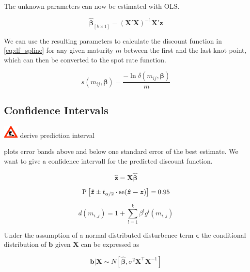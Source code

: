        
The unknown parameters can now be estimated with OLS.
	
\begin{equation}
\label{eq:paramspline}
\bm{\hat \beta}_{\left[k \times 1\right]}= \left( \bm{X}' \bm{X}\right )^{-1}\bm{X}' \bm{z}
\end{equation}


We can use the resulting parameters to calculate the discount function in \eqref{eq:df_spline} for any given maturity $m$ between the first and the last knot point, which can then be converted to the spot rate function.



\begin{equation}
  \label{eq:transformdf}
  s(m_{ij},\bm{\beta}) = \frac{-\ln \delta(m_{ij},\bm{\beta})}{m}
\end{equation}


\subsection{Confidence Intervals}\includegraphics[width=0.3in]{baustelle} derive prediction interval



\cite{McCulloch1975} plots error bands above and below one standard error of the best estimate. We want to give a confidence intervall for the predicted discount function.

\begin{equation}
  \label{eq:yhat}
  \bm{\hat{z}}=\bm{X}\bm{\hat{\beta}}
\end{equation}


\begin{equation}
  \label{eq:predint}
 \mbox{P}\left[\bm{\hat{z}}\pm t_{\alpha/2}\cdot \operatorname*{se}(\bm{\hat{z}-z})\right]=0.95
\end{equation}


\begin{equation}
  \label{eq:printvdf}
  d(m_{i,j})=1+\sum_{l=1}^k\beta^lg^l(m_{i,j})
\end{equation}



\cite{Greene2002}
Under the assumption of a normal distributed disturbence term $\bm{\epsilon}$ the conditional distribution of $\bm{b}$ given $\bm{X}$ can be expressed as


\begin{equation}
  \label{eq:bddistrb}
  \bm{b}|\bm{X} \sim N\left[\bm{\hat \beta}, \sigma^2\bm{X^\top}\bm{X}^{-1}\right]
\end{equation}

